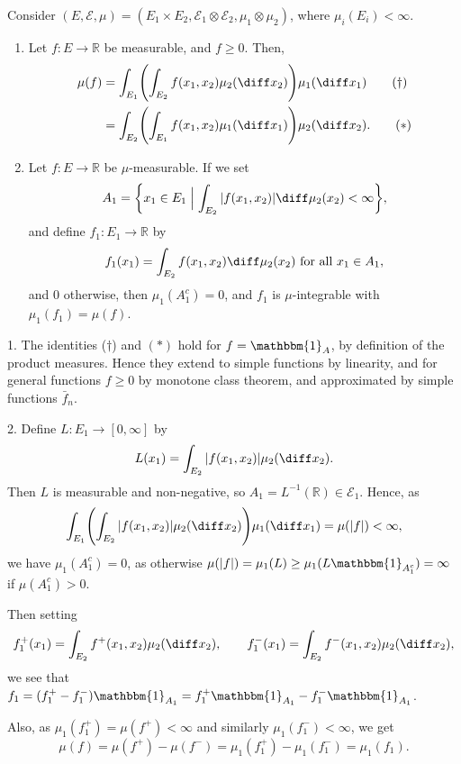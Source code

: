 \documentclass[12pt]{article}
\begin{document}
\begin{theorem}
	Consider $(E, \mathcal{E}, \mu) = (E_1 \times E_2, \mathcal{E}_1 \otimes \mathcal{E}_2, \mu_1 \otimes \mu_2)$, where $\mu_i(E_i) < \infty$.
	\begin{enumerate}[\normalfont1.]
		\item Let $f : E \to \mathbb{R}$ be measurable, and $f \geq 0$. Then,
			\begin{align*}
			\mu(f) &= \int_{E_1}\Biggl( \int_{E_2} f(x_1, x_2) \mu_2(\diff x_2) \Biggr) \mu_1(\diff x_1) \tag{$\dagger$}\\
			       &= \int_{E_2} \Biggl( \int_{E_1} f(x_1, x_2) \mu_1(\diff x_1) \Biggr) \mu_2(\diff x_2). \tag{$\ast$}
			\end{align*}
		\item Let $f : E \to \mathbb{R}$ be $\mu$-measurable. If we set
			\[
				A_1 = \biggl\{x_1 \in E_1 \Bigm|  \int_{E_2} |f(x_1, x_2)| \diff \mu_2(x_2) < \infty \biggr\},
			\]
			and define $f_1 : E_1 \to \mathbb{R}$ by
			\[
				f_1(x_1) = \int_{E_2} f(x_1, x_2) \diff \mu_2(x_2) \text{ for all } x_1 \in A_1,
			\]
			and $0$ otherwise, then $\mu_1(A_1^{c}) = 0$, and $f_1$ is $\mu$-integrable with $\mu_1(f_1) = \mu(f)$.
	\end{enumerate}
\end{theorem}

\begin{proofbox}
	

	1. The identities ($\dagger$) and $(\ast)$ hold for $f = \mathbbm{1}_{A}$, by definition of the product measures. Hence they extend to simple functions by linearity, and for general functions $f \geq 0$ by monotone class theorem, and approximated by simple functions $\bar f_n$.

	2. Define $L : E_1 \to [0, \infty]$ by
	\[
	L(x_1)= \int_{E_2}|f(x_1, x_2)|\mu_2(\diff x_2).
	\]
	Then $L$ is measurable and non-negative, so $A_1 = L^{-1}(\mathbb{R}) \in \mathcal{E}_1$. Hence, as
	\[
	\int_{E_1} \Biggl( \int_{E_2} |f(x_1, x_2)| \mu_2 (\diff x_2) \Biggr) \mu_1(\diff x_1) = \mu(|f|) < \infty,
	\]
	we have $\mu_1(A_1^{c}) = 0$, as otherwise $\mu(|f|) = \mu_1(L) \geq \mu_1(L \mathbbm{1}_{A_1^{c}}) = \infty$ if $\mu(A_1^{c}) > 0$.

	Then setting
	\[
	f_1^+(x_1) = \int_{E_2} f^+ (x_1, x_2) \mu_2(\diff x_2), \qquad f_1^-(x_1) = \int_{E_2} f^-(x_1, x_2) \mu_2(\diff x_2),
	\]
	we see that $f_1 = (f_1^+ - f_1^-) \mathbbm{1}_{A_1} = f_1^+ \mathbbm{1}_{A_1} - f_1^- \mathbbm{1}_{A_1}$.

	Also, as $\mu_1(f_1^+) = \mu(f^+) < \infty$ and similarly $\mu_1(f_1^-) < \infty$, we get
	\[
	\mu(f) = \mu(f^+) - \mu(f^-) = \mu_1(f_1^+) - \mu_1(f_1^-) = \mu_1(f_1).
	\]
\end{proofbox}
\end{document}
